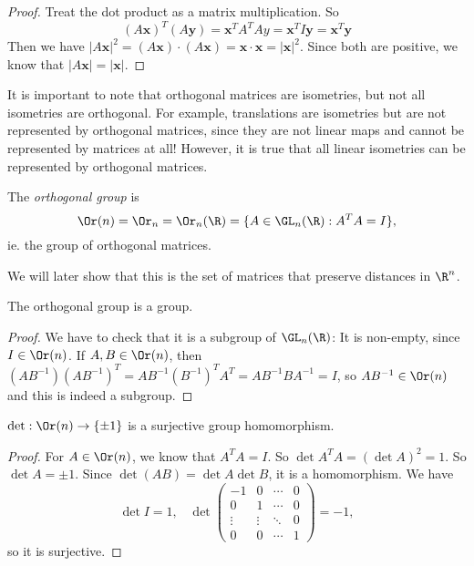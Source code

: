 \documentclass[a4paper]{article}
\begin{document}
\begin{proof}
  Treat the dot product as a matrix multiplication. So
  \[
    (A\mathbf{x})^T(A\mathbf{y}) = \mathbf{x}^{T}A^TAy = \mathbf{x}^TI\mathbf{y} = \mathbf{x}^T\mathbf{y}
  \]
  Then we have $|A\mathbf{x}|^2 = (A\mathbf{x})\cdot (A\mathbf{x}) = \mathbf{x}\cdot \mathbf{x} = |\mathbf{x}|^2$. Since both are positive, we know that $|A\mathbf{x}| = |\mathbf{x}|$.
\end{proof}
It is important to note that orthogonal matrices are isometries, but not all isometries are orthogonal. For example, translations are isometries but are not represented by orthogonal matrices, since they are not linear maps and cannot be represented by matrices at all! However, it is true that all linear isometries can be represented by orthogonal matrices.

\begin{defi}
  The \emph{orthogonal group} is
  \[
    \Or(n) = \Or_n = \Or_n(\R) = \{A\in \GL_n(\R): A^TA = I\},
  \]
  ie. the group of orthogonal matrices.
\end{defi}
We will later show that this is the set of matrices that preserve distances in $\R^n$.

\begin{lemma}
  The orthogonal group is a group.
\end{lemma}

\begin{proof}
  We have to check that it is a subgroup of $\GL_n(\R)$: It is non-empty, since $I\in \Or(n)$. If $A, B\in \Or(n)$, then $(AB^{-1})(AB^{-1})^T = AB^{-1}(B^{-1})^TA^{T} = AB^{-1}BA^{-1} = I$, so $AB^{-1}\in \Or(n)$ and this is indeed a subgroup.
\end{proof}


\begin{prop}
  $\det: \Or(n) \to \{\pm 1\}$ is a surjective group homomorphism.
\end{prop}

\begin{proof}
  For $A\in \Or(n)$, we know that $A^TA = I$. So $\det A^TA = (\det A)^2  = 1$. So $\det A = \pm 1$. Since $\det(AB) = \det A\det B$, it is a homomorphism. We have
  \[
    \det I = 1,\;\;\;\det
    \begin{pmatrix}
      -1 & 0 &\cdots & 0\\
      0 & 1 & \cdots & 0\\
      \vdots & \vdots & \ddots & 0\\
      0 & 0 & \cdots & 1
    \end{pmatrix} = -1,
  \]
  so it is surjective.
\end{proof}
\end{document}
